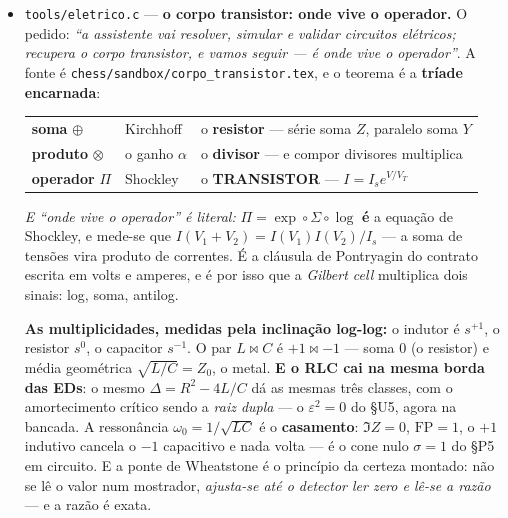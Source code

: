 \documentclass[11pt]{article}
\newcommand{\code}[1]{\texttt{\small #1}}
\theoremstyle{plain}
\theoremstyle{remark}
\begin{document}
\begin{itemize}
\textbf{E NAND é universal, medido construindo:} NOT, AND, OR e XOR feitos só com NAND, comparados
tabela a tabela. Uma porta só --- dois transistores em série --- e toda a lógica cabe nela repetida.
Finalmente §A8 valida pelos dois caminhos: o \emph{ripple-carry} de $8$ bits contra $x+y$, em
$65\,536$ pares, resíduo $0$. \emph{O contínuo amputado vira discreto, e o discreto encadeado volta
a contar} --- e a tríade não mudou de sítio, mudou de regime: a soma está no XOR, o produto no AND,
e o operador na própria decisão de qual lado.

\item \code{tools/eletrico.c} --- \textbf{o corpo transistor: onde vive o operador.} O pedido: \emph{``a assistente vai resolver, simular e validar circuitos elétricos; recupera o corpo
transistor, e vamos seguir --- é onde vive o operador''}. A fonte é
\code{chess/sandbox/corpo\_transistor.tex}, e o teorema é a \textbf{tríade encarnada}:
\begin{center}
\begin{tabular}{lll}
\textbf{soma} $\oplus$ & Kirchhoff & o \textbf{resistor} --- série soma $Z$, paralelo soma $Y$ \\
\textbf{produto} $\otimes$ & o ganho $\alpha$ & o \textbf{divisor} --- e compor divisores multiplica \\
\textbf{operador} $\Pi$ & Shockley & o \textbf{TRANSISTOR} --- $I=I_s e^{V/V_T}$ \\
\end{tabular}
\end{center}
\emph{E ``onde vive o operador'' é literal:} $\Pi=\exp\circ\Sigma\circ\log$ \textbf{é} a equação de
Shockley, e mede-se que $I(V_1{+}V_2)=I(V_1)I(V_2)/I_s$ --- a soma de tensões vira produto de
correntes. É a cláusula de Pontryagin do contrato escrita em volts e amperes, e é por isso que a
\emph{Gilbert cell} multiplica dois sinais: log, soma, antilog.

\textbf{As multiplicidades, medidas pela inclinação log-log:} o indutor é $s^{+1}$, o resistor
$s^0$, o capacitor $s^{-1}$. O par $L\bowtie C$ é $+1\bowtie-1$ --- soma $0$ (o resistor) e média
geométrica $\sqrt{L/C}=Z_0$, o metal. \textbf{E o RLC cai na mesma borda das EDs}: o mesmo
$\Delta=R^2-4L/C$ dá as mesmas três classes, com o amortecimento crítico sendo a \emph{raiz dupla}
--- o $\varepsilon^2=0$ do §U5, agora na bancada. A ressonância $\omega_0=1/\sqrt{LC}$ é o
\textbf{casamento}: $\Im Z=0$, $\mathrm{FP}=1$, o $+1$ indutivo cancela o $-1$ capacitivo e nada
volta --- é o cone nulo $\sigma=1$ do §P5 em circuito. E a ponte de Wheatstone é o princípio da
certeza montado: não se lê o valor num mostrador, \emph{ajusta-se até o detector ler zero e lê-se a
razão} --- e a razão é exata.


\end{itemize}
\end{document}

